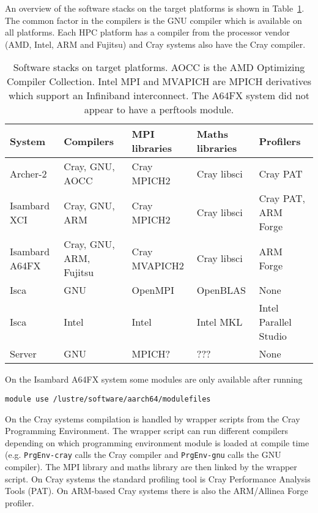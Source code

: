 \documentclass[a4paper,titlepage]{article}
\begin{document}
An overview of the software stacks on the target platforms is shown in Table~\ref{tab:software}. 
The common factor in the compilers is the GNU compiler which is available on all platforms. Each HPC platform has a compiler from the processor vendor (AMD, Intel, ARM and Fujitsu) and Cray systems also have the Cray compiler.
\begin{table}[htp]
\begin{center}
\begin{tabular}{|l|l|l|l|l|}
\hline 
System         & Compilers               & MPI libraries  & Maths libraries & Profilers            \\
\hline
Archer-2       & Cray, GNU, AOCC         & Cray MPICH2     & Cray libsci     & Cray PAT             \\
Isambard XCI   & Cray, GNU, ARM          & Cray MPICH2     & Cray libsci     & Cray PAT, ARM Forge  \\
Isambard A64FX & Cray, GNU, ARM, Fujitsu & Cray MVAPICH2   & Cray libsci     & ARM Forge            \\
Isca           & GNU                     & OpenMPI         & OpenBLAS        & None                  \\
Isca           & Intel                   & Intel           & Intel MKL       & Intel Parallel Studio \\
Server         & GNU                     & MPICH?          & ???             & None                  \\
\hline
\end{tabular}
\end{center}
\caption{Software stacks on target platforms. AOCC is the AMD Optimizing Compiler Collection. Intel MPI and MVAPICH are MPICH derivatives which support an Infiniband interconnect.
The A64FX system did not appear to have a perftools module.}
\label{tab:software}
\end{table}
On the Isambard A64FX system some modules are only available after running 
\begin{verbatim}
module use /lustre/software/aarch64/modulefiles
\end{verbatim}

On the Cray systems compilation is handled by wrapper scripts from the Cray Programming Environment. The wrapper script can run different compilers depending on which programming environment module is loaded at compile time (e.g. \texttt{PrgEnv-cray} calls the Cray compiler and \texttt{PrgEnv-gnu} calls the GNU compiler). The MPI library and maths library are then linked by the wrapper script. On Cray systems the standard profiling tool is Cray Performance Analysis Tools (PAT). On ARM-based Cray systems there is also the ARM/Allinea Forge profiler.
\end{document}
